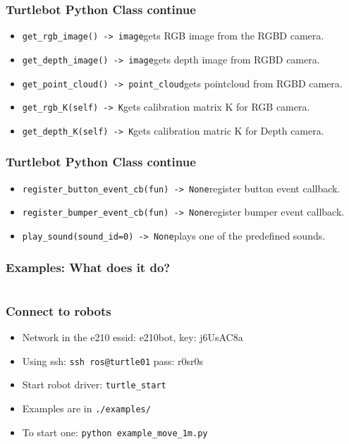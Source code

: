 \documentclass{beamer}
\begin{document}
\begin{frame}[fragile]
  \frametitle{Turtlebot Python Class continue}
  \begin{itemize}
  \item \verb|get_rgb_image() -> image|\break gets RGB image from the RGBD camera.
  \item \verb|get_depth_image() -> image|\break gets depth image from RGBD camera.
  \item \verb|get_point_cloud() -> point_cloud|\break gets pointcloud from RGBD camera.
  \item \verb|get_rgb_K(self) -> K|\break gets calibration matrix K for RGB camera.
  \item \verb|get_depth_K(self) -> K|\break gets calibration matric K for Depth camera.
  \end{itemize}
\end{frame}

\begin{frame}[fragile]
  \frametitle{Turtlebot Python Class continue}
  \begin{itemize}
  \item \verb|register_button_event_cb(fun) -> None|\break register button event callback.
  \item \verb|register_bumper_event_cb(fun) -> None|\break register bumper event callback.
  \item \verb|play_sound(sound_id=0) -> None|\break plays one of the predefined sounds.
  \end{itemize}
\end{frame}

\begin{frame}[fragile]
  \frametitle{Examples: What does it do?}
  \inputminted[linenos, numbersep=5pt, frame=lines]{python}{../scripts/example_move_1m.py}
\end{frame}

\begin{frame}[fragile]
  \frametitle{Connect to robots}
   \begin{itemize}
   \item Network in the e210 essid: e210bot, key: j6UsAC8a
   \item Using ssh: \verb|ssh ros@turtle01| pass: r0sr0s
   \item Start robot driver: \verb|turtle_start|
   \item Examples are in \verb|./examples/|
   \item To start one: \verb|python example_move_1m.py|
   \end{itemize}
\end{frame}
\end{document}
